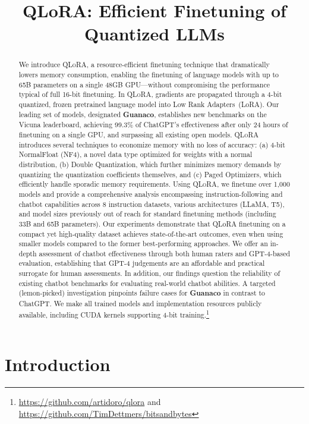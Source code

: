 \title{QLoRA: Efficient Finetuning of Quantized LLMs}

\begin{abstract}
We introduce \textsc{QLoRA}, a resource-efficient finetuning technique that dramatically lowers memory consumption, enabling the finetuning of language models with up to 65B parameters on a single 48GB GPU—without compromising the performance typical of full 16-bit finetuning. In \textsc{QLoRA}, gradients are propagated through a 4-bit quantized, frozen pretrained language model into Low Rank Adapters~(LoRA). Our leading set of models, designated \textbf{Guanaco}, establishes new benchmarks on the Vicuna leaderboard, achieving 99.3\% of ChatGPT's effectiveness after only 24 hours of finetuning on a single GPU, and surpassing all existing open models. \textsc{QLoRA} introduces several techniques to economize memory with no loss of accuracy: (a) 4-bit NormalFloat (NF4), a novel data type optimized for weights with a normal distribution, (b) Double Quantization, which further minimizes memory demands by quantizing the quantization coefficients themselves, and (c) Paged Optimizers, which efficiently handle sporadic memory requirements. Using \textsc{QLoRA}, we finetune over 1,000 models and provide a comprehensive analysis encompassing instruction-following and chatbot capabilities across 8 instruction datasets, various architectures (LLaMA, T5), and model sizes previously out of reach for standard finetuning methods (including 33B and 65B parameters). Our experiments demonstrate that QLoRA finetuning on a compact yet high-quality dataset achieves state-of-the-art outcomes, even when using smaller models compared to the former best-performing approaches. We offer an in-depth assessment of chatbot effectiveness through both human raters and GPT-4-based evaluation, establishing that GPT-4 judgements are an affordable and practical surrogate for human assessments. In addition, our findings question the reliability of existing chatbot benchmarks for evaluating real-world chatbot abilities. A targeted (lemon-picked) investigation pinpoints failure cases for \textbf{Guanaco} in contrast to ChatGPT. We make all trained models and implementation resources publicly available, including CUDA kernels supporting 4-bit training.\footnote{\url{https://github.com/artidoro/qlora} and \url{https://github.com/TimDettmers/bitsandbytes}}
\end{abstract}

\section{Introduction}

